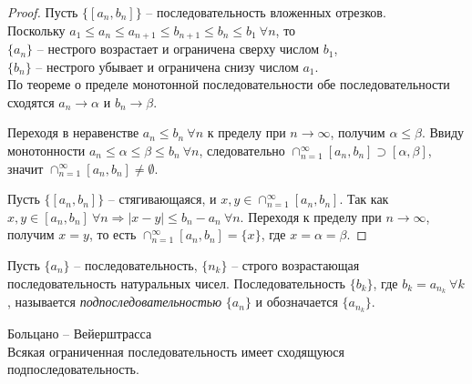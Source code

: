     \begin{proof}
        Пусть $\{[a_{n}, b_{n}]\}$ -- последовательность вложенных отрезков.\\
        Поскольку $a_1 \leq a_{n} \leq a_{n+1} \leq b_{n+1} \leq b_{n} \leq b_1 \ \forall n$, то \\
        $\{a_{n}\}$ -- нестрого возрастает и ограничена сверху числом $b_1$,\\
        $\{b_{n}\}$ -- нестрого убывает и ограничена снизу числом $a_1$.\\
        По теореме о пределе монотонной последовательности обе последовательности сходятся $a_{n} \to \alpha$ и $b_{n} \to \beta$.
        
        Переходя в неравенстве $a_{n} \leq b_{n} \ \forall n$ к пределу при $n \to \infty$, получим $\alpha \leq \beta$. Ввиду монотонности $a_{n} \leq \alpha \leq \beta \leq b_{n} \ \forall n$, следовательно $\cap_{n = 1}^{\infty}[a_{n}, b_{n}] \supset [\alpha, \beta]$, значит $\cap_{n = 1}^{\infty}[a_{n}, b_{n}] \neq \emptyset$.
        
        Пусть $\{[a_{n}, b_{n}]\}$ -- стягивающаяся, и $x, y \in \cap_{n = 1}^{\infty} [a_{n}, b_{n}]$. Так как $x, y \in [a_{n}, b_{n}] \ \forall n \Rightarrow |x-y| \leq b_{n} - a_{n} \ \forall n$. Переходя к пределу при $n \rightarrow \infty$, получим $x = y$, то есть $\cap_{n = 1}^{\infty}[a_{n}, b_{n}] = \{x\}$, где $x = \alpha = \beta$.
    \end{proof}

    \begin{definition}
        Пусть $\{a_{n}\}$ -- последовательность, $\{n_{k}\}$ -- строго возрастающая последовательность натуральных чисел. Последовательность $\{b_{k}\}$, где $b_{k} = a_{n_{k}} \ \forall k$, называется \textit{подпоследовательностью} $\{a_{n}\}$ и обозначается $\{a_{n_{k}}\}$.
    \end{definition}
    
    \begin{theorem}{Больцано -- Вейерштрасса}\\
        Всякая ограниченная последовательность имеет сходящуюся подпоследовательность.
    \end{theorem}

